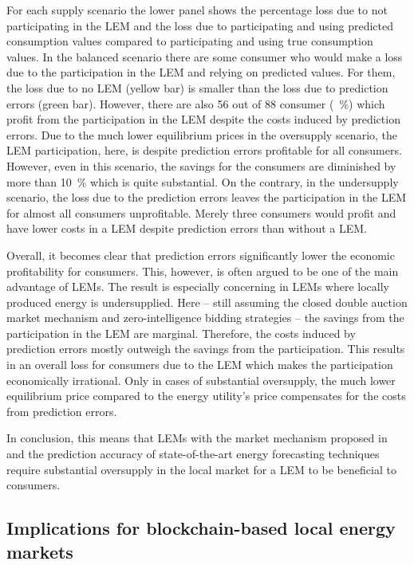 \noindent For each supply scenario the lower panel shows the percentage loss due to not participating in the LEM and the loss due to participating and using predicted consumption values compared to participating and using true consumption values. In the balanced scenario there are some consumer who would make a loss due to the participation in the LEM and relying on predicted values. For them, the loss due to no LEM (yellow bar) is smaller than the loss due to prediction errors (green bar). However, there are also 56 out of 88 consumer (~\%) which profit from the participation in the LEM despite the costs induced by prediction errors. Due to the much lower equilibrium prices in the oversupply scenario, the LEM participation, here, is despite prediction errors profitable for all consumers. However, even in this scenario, the savings for the consumers are diminished by more than 10~\% which is quite substantial. On the contrary, in the undersupply scenario, the loss due to the prediction errors leaves the participation in the LEM for almost all consumers unprofitable. Merely three consumers would profit and have lower costs in a LEM despite prediction errors than without a LEM.

Overall, it becomes clear that prediction errors significantly lower the economic profitability for consumers. This, however, is often argued to be one of the main advantage of LEMs. The result is especially concerning in LEMs where locally produced energy is undersupplied. Here -- still assuming the closed double auction market mechanism and zero-intelligence bidding strategies -- the savings from the participation in the LEM are marginal. Therefore, the costs induced by prediction errors mostly outweigh the savings from the participation. This results in an overall loss for consumers due to the LEM which makes the participation economically irrational. Only in cases of substantial oversupply, the much lower equilibrium price compared to the energy utility's price compensates for the costs from prediction errors.

In conclusion, this means that LEMs with the market mechanism proposed in \citet{Mengelkamp:2018a} and the prediction accuracy of state-of-the-art energy forecasting techniques require substantial oversupply in the local market for a LEM to be beneficial to consumers.




\subsection{Implications for blockchain-based local energy markets}\label{Sec:Results;Subsec:Implications}

